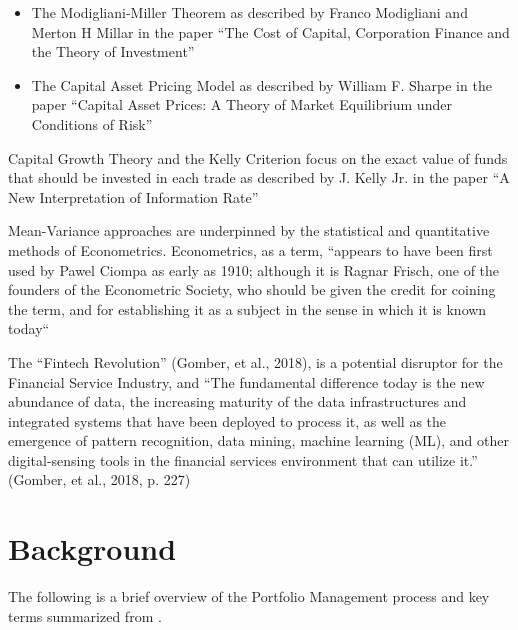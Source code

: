\documentclass[oneside,12pt]{Classes/RoboticsLaTeX}
\begin{document}
\begin{itemize}
\item The Modigliani-Miller Theorem as described by Franco Modigliani and Merton H Millar in the paper “The Cost of Capital, Corporation Finance and the Theory of Investment” \citep{FrancoModigliani1958TCoC}
\end{itemize}

\begin{itemize}
\item The Capital Asset Pricing Model as described by William F. Sharpe in the paper “Capital Asset Prices: A Theory of Market Equilibrium under Conditions of Risk” \citep{Sharpe49}
\end{itemize}

Capital Growth Theory and the Kelly Criterion focus on the exact value of funds that should be invested in each trade as described by J. Kelly Jr. in the paper “A New Interpretation of Information Rate” \citep{KellyJ1956Anio}

Mean-Variance approaches are underpinned by the statistical and quantitative methods of Econometrics.  Econometrics, as a term, “appears to have been first used by Pawel Ciompa as early as 1910; although it is Ragnar Frisch, one of the founders of the Econometric Society, who should be given the credit for coining the term, and for establishing it as a subject in the sense in which it is known today“ \citep[p.1]{PES90}

The “Fintech Revolution” (Gomber, et al., 2018), is a potential disruptor for the Financial Service Industry, and “The fundamental difference today is the new abundance of data, the increasing maturity of the data infrastructures and integrated systems that have been deployed to process it, as well as the emergence of pattern recognition, data mining, machine learning (ML), and other digital-sensing tools in the financial services environment that can utilize it.” (Gomber, et al., 2018, p. 227)

\chapter{Background}
\label{chap:backg}
The following is a brief overview of the Portfolio Management process and key terms summarized from \citet{BakerH.Kent2013PTaM}.
\end{document}
